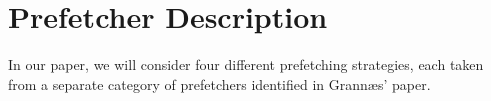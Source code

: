 
\section{Prefetcher Description}
\label{sec:prefetcherDescription}

In our paper, we will consider four different prefetching strategies,
each taken from a separate category of prefetchers identified in
Grannæs' paper. \cite{Grannas}





